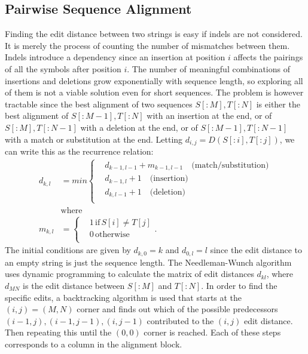 \subsection{Pairwise Sequence Alignment}
\label{sec:pairwise}
Finding the edit distance between two strings is easy if indels are not considered.
It is merely the process of counting the number of mismatches between them.
Indels introduce a dependency since an insertion at position $i$ affects the pairings of all the symbols after position $i$.
The number of meaningful combinations of insertions and deletions grow exponentially with sequence length, so exploring all of them is not a viable solution even for short sequences.
The problem is however tractable since the best alignment of two sequences $S[:M], T[:N]$ is either the best alignment of $S[:M-1], T[:N]$ with an insertion at the end, or of $S[:M], T[:N-1]$ with a deletion at the end, or of $S[:M-1], T[:N-1]$ with a match or substitution at the end. 
Letting $d_{i,j} = D(S[:i], T[:j])$, we can write this as the recurrence relation:
\begin{align*}
  d_{k,l} &= min\begin{cases}
  &d_{k-1,l-1}+m_{k-1, l-1}\quad \text{(match/substitution)}\\
  &d_{k-1,l}+1 \quad \text{(insertion)}\\
  &d_{k, l-1}+1 \quad \text{(deletion)}\\
\end{cases}
  \\
  &\text{where}\\
  m_{k, l} &= \begin{cases} &1 \, \text{if}\, S[i] \neq T[j]\\
                           &0 \, \text{otherwise}\\
                           \end{cases}.
\end{align*}
The initial conditions are given by $d_{k, 0}=k$ and $d_{0,l}=l$ since the edit distance to an empty string is just the sequence length.
The Needleman-Wunch algorithm~\cite{needlemanwunch} uses dynamic programming to calculate the matrix of edit distances $d_{kl}$, where $d_{MN}$ is the edit distance between $S[:M]$ and $T[:N]$.
In order to find the specific edits, a backtracking algorithm is used that starts at the $(i, j) = (M, N)$ corner and finds out which of the possible predecessors $(i-1, j), (i-1, j-1), (i, j-1)$ contributed to the $(i, j)$ edit distance.
Then repeating this until the $(0, 0)$ corner is reached. Each of these steps corresponds to a column in the alignment block.
